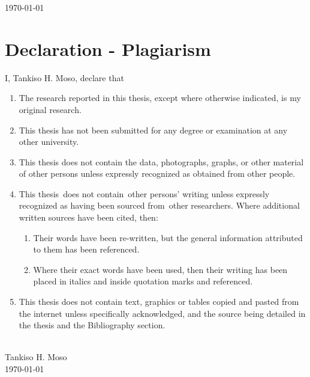 \documentclass[12pt,a4paper]{report}
\begin{document}
\begin{titlepage}
\begin{center}
			{\large \monthyeardate\today}\\ %
		\end{center}
		
		
	\end{titlepage}
	
	
	\section*{Declaration - Plagiarism}
	
	I, Tankiso H. Moso, declare that
	
	\begin{enumerate}
		\item The research reported in this thesis, except where otherwise indicated, is my original research.
		\item This thesis has not been submitted for any degree or examination at any other university.
		\item This thesis does not contain the data, photographs, graphs, or other material of other persons unless expressly recognized as obtained from other people.
		\item This thesis does not contain other persons' writing unless expressly recognized as having been sourced from other researchers. Where additional written sources have been cited, then:
		\begin{enumerate}
			\item Their words have been re-written, but the general information attributed to them has been referenced.
			\item Where their exact words have been used, then their writing has been placed in italics and inside quotation marks and referenced.
		\end{enumerate}
		
		\item This thesis does not contain text, graphics or tables copied and pasted from the internet unless specifically acknowledged, and the source being detailed in the thesis and the Bibliography section.
	\end{enumerate}
	\vspace{2cm}
	
	\begin{minipage}{0.5\textwidth}
		\begin{center} \large
			\hrulefill\\
			Tankiso H. Moso\\[1cm]
			
			{\large \today} %
		\end{center}
	\end{minipage}\\[2cm]	
	
\end{document}
